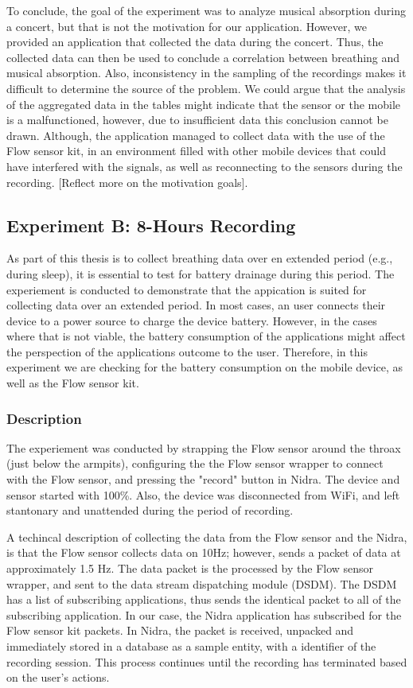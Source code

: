 To conclude, the goal of the experiment was to analyze musical absorption during a concert, but that is not the motivation for our application. However, we provided an application that collected the data during the concert. Thus, the collected data can then be used to conclude a correlation between breathing and musical absorption. Also, inconsistency in the sampling of the recordings makes it difficult to determine the source of the problem. We could argue that the analysis of the aggregated data in the tables might indicate that the sensor or the mobile is a malfunctioned, however, due to insufficient data this conclusion cannot be drawn. Although, the application managed to collect data with the use of the Flow sensor kit, in an environment filled with other mobile devices that could have interfered with the signals, as well as reconnecting to the sensors during the recording. [Reflect more on the motivation goals].

\subsection{Experiment B: 8-Hours Recording}
As part of this thesis is to collect breathing data over en extended period (e.g., during sleep), it is essential to test for battery drainage during this period. The experiement is conducted to demonstrate that the appication is suited for collecting data over an extended period. In most cases, an user connects their device to a power source to charge the device battery. However, in the cases where that is not viable, the battery consumption of the applications might affect the perspection of the applications outcome to the user. Therefore, in this experiment we are checking for the battery consumption on the mobile device, as well as the Flow sensor kit. 

\subsubsection{Description}
The experiement was conducted by strapping the Flow sensor around the throax (just below the armpits), configuring the the Flow sensor wrapper to connect with the Flow sensor, and pressing the "record" button in Nidra. The device and sensor started with 100\%. Also, the device was disconnected from WiFi, and left stantonary and unattended during the period of recording.  

A techincal description of collecting the data from the Flow sensor and the Nidra, is that the Flow sensor collects data on 10Hz; however, sends a packet of data at approximately 1.5 Hz. The data packet is the processed by the Flow sensor wrapper, and sent to the data stream dispatching module (DSDM). The DSDM has a list of subscribing applications, thus sends the identical packet to all of the subscribing application. In our case, the Nidra application has subscribed for the Flow sensor kit packets. In Nidra, the packet is received, unpacked and immediately stored in a database as a sample entity, with a identifier of the recording session. This process continues until the recording has terminated based on the user's actions.

